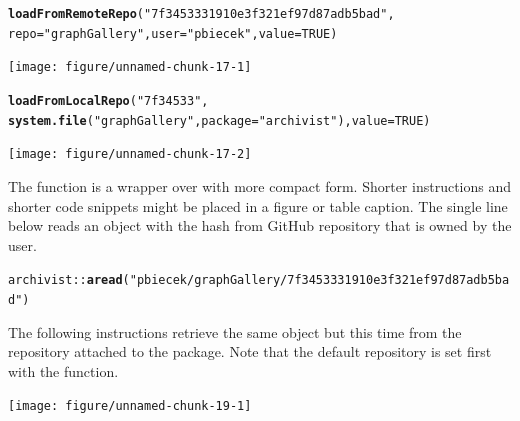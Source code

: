 \documentclass[nojss]{jss}\usepackage[]{graphicx}\usepackage[]{color}
\makeatletter
\newcommand{\hlnum}[1]{\textcolor[rgb]{0.686,0.059,0.569}{#1}}%
\newcommand{\hlstr}[1]{\textcolor[rgb]{0.192,0.494,0.8}{#1}}%
\newcommand{\hlopt}[1]{\textcolor[rgb]{0,0,0}{#1}}%
\newcommand{\hlstd}[1]{\textcolor[rgb]{0.345,0.345,0.345}{#1}}%
\newcommand{\hlkwc}[1]{\textcolor[rgb]{0.333,0.667,0.333}{#1}}%
\newcommand{\hlkwd}[1]{\textcolor[rgb]{0.737,0.353,0.396}{\textbf{#1}}}%
\newenvironment{kframe}{%
 \def\at@end@of@kframe{}%
 \ifinner\ifhmode%
  \def\at@end@of@kframe{\end{minipage}}%
  \begin{minipage}{\columnwidth}%
 \fi\fi%
 \def\FrameCommand##1{\hskip\@totalleftmargin \hskip-\fboxsep
 \colorbox{shadecolor}{##1}\hskip-\fboxsep
     \hskip-\linewidth \hskip-\@totalleftmargin \hskip\columnwidth}%
 \MakeFramed {\advance\hsize-\width
   \@totalleftmargin\z@ \linewidth\hsize
   \@setminipage}}%
 {\par\unskip\endMakeFramed%
 \at@end@of@kframe}
\newenvironment{knitrout}{}{} %
\makeatother
\begin{document}
\begin{knitrout}
\color{fgcolor}\begin{kframe}
\begin{alltt}
\hlkwd{loadFromRemoteRepo}\hlstd{(}\hlstr{"7f3453331910e3f321ef97d87adb5bad"}\hlstd{,}
    \hlkwc{repo} \hlstd{=} \hlstr{"graphGallery"}\hlstd{,} \hlkwc{user} \hlstd{=} \hlstr{"pbiecek"}\hlstd{,} \hlkwc{value} \hlstd{=} \hlnum{TRUE}\hlstd{)}
\end{alltt}
\end{kframe}
\texttt{[image: figure/unnamed-chunk-17-1]} 
\begin{kframe}\begin{alltt}
\hlkwd{loadFromLocalRepo}\hlstd{(}\hlstr{"7f34533"}\hlstd{,}
    \hlkwd{system.file}\hlstd{(}\hlstr{"graphGallery"}\hlstd{,} \hlkwc{package} \hlstd{=} \hlstr{"archivist"}\hlstd{),} \hlkwc{value} \hlstd{=} \hlnum{TRUE}\hlstd{)}
\end{alltt}
\end{kframe}
\texttt{[image: figure/unnamed-chunk-17-2]} 

\end{knitrout}



The  function is a wrapper over  with more compact form. Shorter instructions and shorter code snippets might be placed in a figure or table caption. The single line below reads an object with the  hash from  GitHub repository  that is owned by the  user.

\begin{knitrout}
\color{fgcolor}\begin{kframe}
\begin{alltt}
\hlstd{archivist}\hlopt{::}\hlkwd{aread}\hlstd{(}\hlstr{"pbiecek/graphGallery/7f3453331910e3f321ef97d87adb5bad"}\hlstd{)}
\end{alltt}
\end{kframe}
\end{knitrout}



The following instructions retrieve the same  object but this time from the  repository attached to the  package. Note that the default repository is set first with the  function.

\begin{knitrout}
\color{fgcolor}
\texttt{[image: figure/unnamed-chunk-19-1]} 

\end{knitrout}
\end{document}
